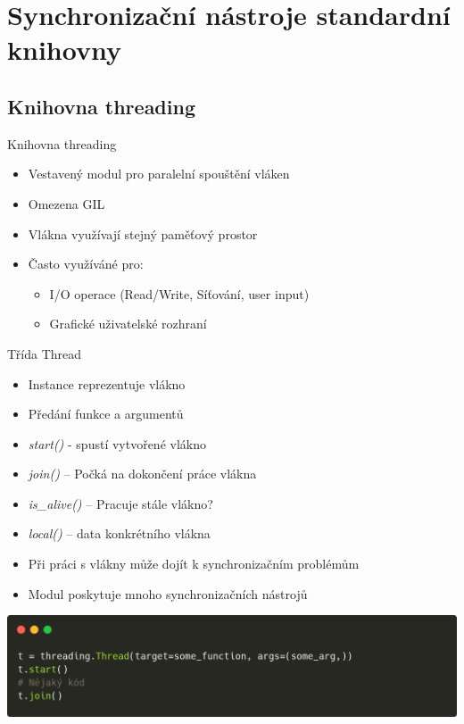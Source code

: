 \documentclass{beamer}
\begin{document}
\section{Synchronizační nástroje standardní knihovny}
\subsection{Knihovna threading}

\begin{frame}{Knihovna threading}
    \begin{itemize}
        \item Vestavený modul pro paralelní spouštění vláken
        \item Omezena GIL
        \item Vlákna využívají stejný paměťový prostor
        \vskip 0.35in
        \item Často využíváné pro:
        \begin{itemize}
            \item I/O operace (Read/Write, Síťování, user input)
            \item Grafické uživatelské rozhraní 
        \end{itemize}
    \end{itemize}
\end{frame}

\begin{frame}[fragile]{Třída Thread}
    \begin{itemize}
        \item Instance reprezentuje vlákno
        \item Předání funkce a argumentů
        \vskip 0.2in

        \item \textit{start()} - spustí vytvořené vlákno
        \item \textit{join()} – Počká na dokončení práce vlákna
        \item \textit{is\_alive()} – Pracuje stále vlákno?
        \item \textit{local()} – data konkrétního vlákna

        \vskip 0.2in
        \item Při práci s vlákny může dojít k synchronizačním problémům
        \item Modul poskytuje mnoho synchronizačních nástrojů
    \end{itemize}
    \scriptsize

    \begin{center}
        \includegraphics[width=\textwidth]{obrazky/codes/carbon1.png}
    \end{center}
\end{frame}
\end{document}
